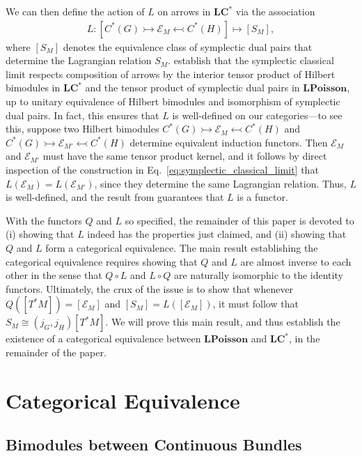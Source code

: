 \documentclass[sn-mathphys,Numbered]{sn-jnl}
\begin{document}
We can then define the action of $L$ on arrows in $\mathbf{LC^*}$ via the association
\begin{align}
    L: [C^*(G)\rightarrowtail\mathcal{E}_M\leftarrowtail C^*(H)]\mapsto [S_M],
\end{align}
where $[S_M]$ denotes the equivalence class of symplectic dual pairs that determine the Lagrangian relation $S_M$.
\citet{FeSt24} establish that the symplectic classical limit respects composition of arrows by the interior tensor product of Hilbert bimodules in $\mathbf{LC^*}$ and the tensor product of symplectic dual pairs in $\mathbf{LPoisson}$, up to unitary equivalence of Hilbert bimodules and isomorphism of symplectic dual pairs.  In fact, this ensures that $L$ is well-defined on our categories---to see this, suppose two Hilbert bimodules $C^*(G)\rightarrowtail\mathcal{E}_M\leftarrowtail C^*(H)$ and $C^*(G)\rightarrowtail\mathcal{E}_{M'}\leftarrowtail C^*(H)$ determine equivalent induction functors.  Then $\mathcal{E}_M$ and $\mathcal{E}_{M'}$ must have the same tensor product kernel, and it follows by direct inspection of the construction in Eq.~\eqref{eq:symplectic_classical_limit} that $L(\mathcal{E}_M)= L(\mathcal{E}_{M'})$, since they determine the same Lagrangian relation.  Thus, $L$ is well-defined, and the result from \citet{FeSt24} guarantees that $L$ is a functor.

With the functors $Q$ and $L$ so specified, the remainder of this paper is devoted to (i) showing that $L$ indeed has the properties just claimed, and (ii) showing that $Q$ and $L$ form a categorical equivalence.  The main result establishing the categorical equivalence requires showing that $Q$ and $L$ are almost inverse to each other in the sense that $Q\circ L$ and $L\circ Q$ are naturally isomorphic to the identity functors.  Ultimately, the crux of the issue is to show that whenever $Q\left([T^*M]\right) = [\mathcal{E}_M]$ and $[S_M] = L\left([\mathcal{E}_M]\right)$, it must follow that $S_M\cong (j_G,j_H)[T^*M]$.  We will prove this main result, and thus establish the existence of a categorical equivalence between $\mathbf{LPoisson}$ and $\mathbf{LC^*}$, in the remainder of the paper.

\section{Categorical Equivalence}
\label{sec:equivalence}

\subsection{Bimodules between Continuous Bundles}
\end{document}
